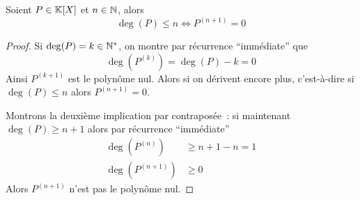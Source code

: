 \begin{prop}
  Soient \(P \in \mathbb{K}[X]\) et \(n \in \mathbb{N}\), alors
  \begin{equation}
    \deg(P) \leqslant n \iff P^{(n+1)} = 0
  \end{equation}
\end{prop}
\begin{proof}
  Si \(\deg(P) = k \in \mathbb{N}^*\), on montre par récurrence ``immédiate'' que
  \begin{equation}
    \deg(P^{(k)}) = \deg(P)-k = 0
  \end{equation}
  Ainsi \(P^{(k+1)}\) est le polynôme nul. Alors si on dérivent encore plus, 
  c'est-à-dire si \(\deg(P) \leqslant n\) alors \(P^{(n+1)} = 0\).

  Montrons la deuxième implication par contraposée~: si maintenant \(\deg(P) 
  \geqslant n+1\) alors par récurrence ``immédiate''
  \begin{align}
    \deg(P^{(n)}) &\geqslant n+1-n = 1 \\
    \deg(P^{(n+1)}) &\geqslant 0
  \end{align}
Alors \(P^{(n+1)}\) n'est pas le polynôme nul. \end{proof}

